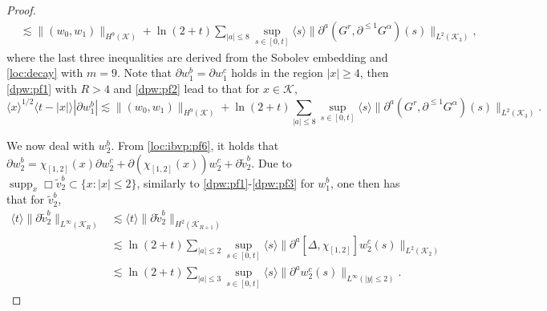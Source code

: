 \documentclass[11pt,twoside]{article}
\def\cK{\mathcal K}
\def\supp{\mathop{\rm supp}\nolimits}
\def\p{\partial}
\def\supp{\operatorname{supp}}
\def\ls{\lesssim}
\newcommand{\w}[1]{\langle {#1} \rangle}
\theoremstyle{plain}
\theoremstyle{definition}
\numberwithin{equation}{section}
\begin{document}
\begin{proof}
\begin{equation}
\begin{split}
&\ls\|(w_0,w_1)\|_{H^9(\cK)}+\ln(2+t)\sum_{|a|\le8}\sup_{s\in[0,t]}\w{s}\|\p^a(G^r,\p^{\le1}G^\alpha)(s)\|_{L^2(\cK_3)},
\end{split}
\end{equation}
where the last three inequalities are derived from the Sobolev embedding and \eqref{loc:decay} with $m=9$.
Note that $\p w_1^b=\p w_1^c$ holds in the region $|x|\ge4$, then \eqref{dpw:pf1} with $R>4$ and \eqref{dpw:pf2} lead to that for $x\in\cK$,
\begin{equation}\label{dpw:pf3}
\w{x}^{1/2}\w{t-|x|}|\p w_1^b|
\ls\|(w_0,w_1)\|_{H^9(\cK)}+\ln(2+t)\sum_{|a|\le8}\sup_{s\in[0,t]}\w{s}\|\p^a(G^r,\p^{\le1}G^\alpha)(s)\|_{L^2(\cK_3)}.
\end{equation}

We now deal with $w_2^b$.
From \eqref{loc:ibvp:pf6}, it holds that $\p w_2^b=\chi_{[1,2]}(x)\p w_2^c+\p(\chi_{[1,2]}(x))w_2^c+\p\tilde v_2^b$.
Due to $\supp_x\Box\tilde v_2^b\subset\{x:|x|\le2\}$, similarly to \eqref{dpw:pf1}-\eqref{dpw:pf3} for $w_1^b$,
one then has that for $\tilde v_2^b$,
\begin{equation}\label{dpw:pf4}
\begin{split}
\w{t}\|\p \tilde v_2^b\|_{L^\infty(\cK_R)}
&\ls\w{t}\|\p \tilde v_2^b\|_{H^2(\cK_{R+1})}\\
&\ls\ln(2+t)\sum_{|a|\le2}\sup_{s\in[0,t]}\w{s}\|\p^a[\Delta,\chi_{[1,2]}]w_2^c(s)\|_{L^2(\cK_2)}\\
&\ls\ln(2+t)\sum_{|a|\le3}\sup_{s\in[0,t]}\w{s}\|\p^aw_2^c(s)\|_{L^\infty(|y|\le2)}.
\end{split}
\end{equation}


\end{proof}
\end{document}
